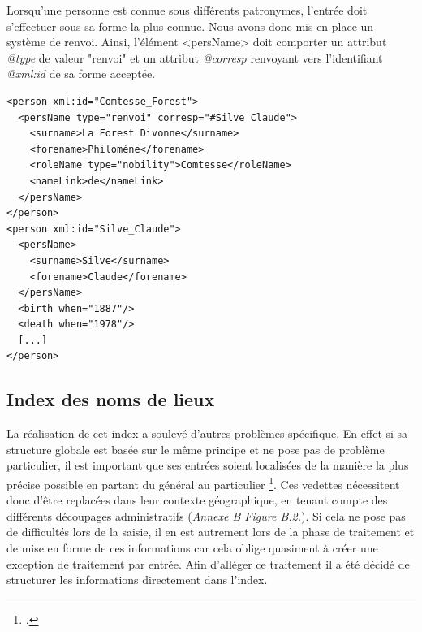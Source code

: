 \documentclass[12pt,a4paper]{book} %
\begin{document}
Lorsqu'une personne est connue sous différents patronymes, l'entrée doit s'effectuer sous sa forme la plus connue. Nous avons donc mis en place un système de renvoi. Ainsi, l'élément <persName> doit comporter un attribut \textit{@type} de valeur "renvoi" et un attribut \textit{@corresp} renvoyant vers l'identifiant \textit{@xml:id} de sa forme acceptée. 
\bigskip

\begin{lstlisting} 
<person xml:id="Comtesse_Forest">
  <persName type="renvoi" corresp="#Silve_Claude">                                                                     
    <surname>La Forest Divonne</surname>                                             
    <forename>Philomène</forename>
    <roleName type="nobility">Comtesse</roleName>
    <nameLink>de</nameLink>
  </persName>                  
</person>
<person xml:id="Silve_Claude">
  <persName>
    <surname>Silve</surname>
    <forename>Claude</forename>                                                                                                                                 
  </persName>
  <birth when="1887"/>
  <death when="1978"/>
  [...]
</person>
\end{lstlisting}
\bigskip

\subsection{Index des noms de lieux}

La réalisation de cet index a soulevé d'autres problèmes spécifique. En effet si sa structure globale est basée sur le même principe et ne pose pas de problème particulier, il est important que ses entrées soient localisées de la manière la plus précise possible en partant \og du général au particulier \fg{}\footcite[p. 138]{nougaret_ledition_2015}. Ces vedettes nécessitent donc d'être replacées dans leur contexte géographique, en tenant compte des différents découpages administratifs (\textit{Annexe B Figure B.2.}). Si cela ne pose pas de difficultés lors de la saisie, il en est autrement lors de la phase de traitement et de mise en forme de ces informations car cela oblige quasiment à créer une exception de traitement par entrée.
Afin d'alléger ce traitement il a été décidé de structurer les informations directement dans l'index.
\bigskip
\end{document}
